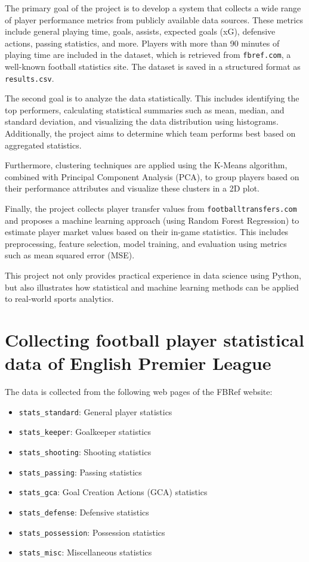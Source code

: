 \documentclass[a4paper,12pt]{article}
\begin{document}
The primary goal of the project is to develop a system that collects a wide range of player performance metrics from publicly available data sources. These metrics include general playing time, goals, assists, expected goals (xG), defensive actions, passing statistics, and more. Players with more than 90 minutes of playing time are included in the dataset, which is retrieved from \texttt{fbref.com}, a well-known football statistics site. The dataset is saved in a structured format as \texttt{results.csv}.

The second goal is to analyze the data statistically. This includes identifying the top performers, calculating statistical summaries such as mean, median, and standard deviation, and visualizing the data distribution using histograms. Additionally, the project aims to determine which team performs best based on aggregated statistics.

Furthermore, clustering techniques are applied using the K-Means algorithm, combined with Principal Component Analysis (PCA), to group players based on their performance attributes and visualize these clusters in a 2D plot.

Finally, the project collects player transfer values from \texttt{footballtransfers.com} and proposes a machine learning approach (using Random Forest Regression) to estimate player market values based on their in-game statistics. This includes preprocessing, feature selection, model training, and evaluation using metrics such as mean squared error (MSE).

This project not only provides practical experience in data science using Python, but also illustrates how statistical and machine learning methods can be applied to real-world sports analytics.

\newpage

\section{Collecting football player statistical data of English Premier League}

The data is collected from the following web pages of the FBRef website:
\begin{itemize}
    \item \texttt{stats\_standard}: General player statistics
    \item \texttt{stats\_keeper}: Goalkeeper statistics
    \item \texttt{stats\_shooting}: Shooting statistics
    \item \texttt{stats\_passing}: Passing statistics
    \item \texttt{stats\_gca}: Goal Creation Actions (GCA) statistics
    \item \texttt{stats\_defense}: Defensive statistics
    \item \texttt{stats\_possession}: Possession statistics
    \item \texttt{stats\_misc}: Miscellaneous statistics
\end{itemize}
\end{document}

